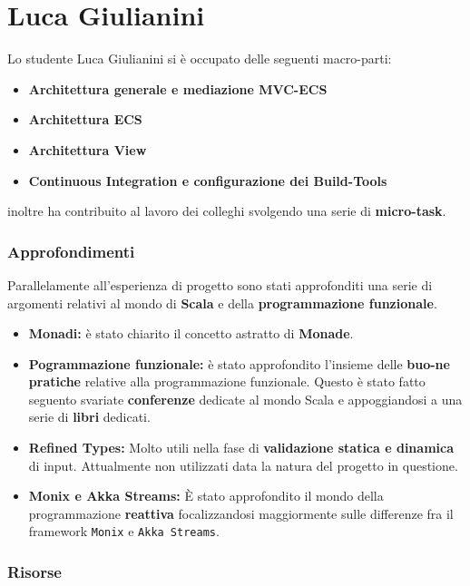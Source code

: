 \section{Luca Giulianini}
Lo studente Luca Giulianini si è occupato delle seguenti macro-parti:
\begin{itemize}
	\item{\textbf{Architettura generale e mediazione MVC-ECS}}
	\item{\textbf{Architettura ECS}}
	\item{\textbf{Architettura View}}
	\item{\textbf{Continuous Integration e configurazione dei Build-Tools}}
\end{itemize}

inoltre ha contribuito al lavoro dei colleghi svolgendo una serie di \textbf{micro-task}.

\subsubsection{Approfondimenti}

Parallelamente all'esperienza di progetto sono stati approfonditi una serie di argomenti relativi al mondo di \textbf{Scala} e della \textbf{programmazione funzionale}. 
\begin{itemize}
	\item{\textbf{Monadi:}} è stato chiarito il concetto astratto di \textbf{Monade}.
	\item{\textbf{Pogrammazione funzionale:}} è stato approfondito l'insieme delle \textbf{buo-ne pratiche} relative alla programmazione funzionale. Questo è stato fatto seguento svariate \textbf{conferenze} dedicate al mondo Scala e appoggiandosi a una serie di \textbf{libri} dedicati. 
	\item{\textbf{Refined Types:}} Molto utili nella fase di \textbf{validazione statica e dinamica} di input. Attualmente non utilizzati data la natura del progetto in questione.
	\item{\textbf{Monix e Akka Streams:}} È stato approfondito il mondo della programmazione \textbf{reattiva} focalizzandosi maggiormente sulle differenze fra il framework \texttt{Monix} e \texttt{Akka Streams}.
\end{itemize}

\subsubsection{Risorse}

